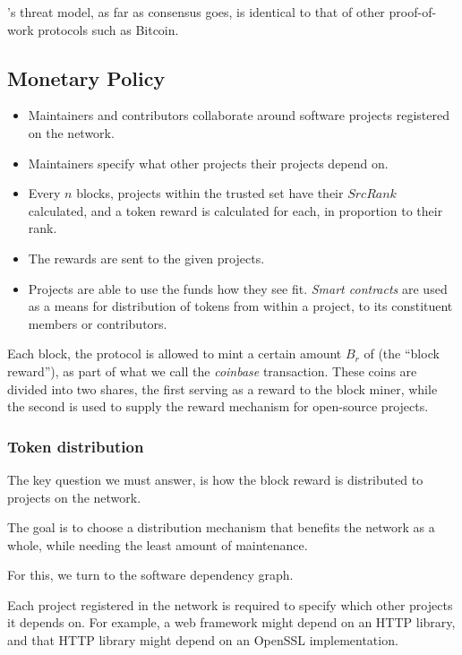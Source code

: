 \oscoin{}'s threat model, as far as consensus goes, is identical to that
of other proof-of-work protocols such as Bitcoin.


\subsection{Monetary Policy}

\begin{itemize}
    \item Maintainers and contributors collaborate around software projects
        registered on the network.
    \item Maintainers specify what other projects their projects depend on.
    \item Every $n$ blocks, projects within the trusted set have their $SrcRank$
        calculated, and a token reward is calculated for each, in proportion
        to their rank.
    \item The rewards are sent to the given projects.
    \item Projects are able to use the funds how they see fit. \emph{Smart
        contracts} are used as a means for distribution of tokens from within a
        project, to its constituent members or contributors.
\end{itemize}

Each block, the protocol is allowed to mint a certain amount $B_r$ of \oscoin{}
(the ``block reward''), as part of what we call the \emph{coinbase}
transaction. These coins are divided into two shares, the first serving as a
reward to the block miner, while the second is used to supply the reward
mechanism for open-source projects.

\subsubsection{Token distribution}

The key question we must answer, is how the block reward is distributed to
projects on the network.

The goal is to choose a distribution mechanism that benefits the network as a
whole, while needing the least amount of maintenance.

For this, we turn to the software dependency graph.

Each project registered in the network is required to specify which other
projects it depends on. For example, a web framework might depend on an HTTP
library, and that HTTP library might depend on an OpenSSL implementation.

